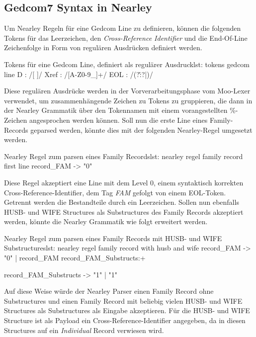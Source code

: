 \subsection{Gedcom7 Syntax in Nearley}
\label{subsec: Implementierung - Gedcom Grammatik - Gedcom7 Syntax in Nearley}
Um Nearley Regeln für eine Gedcom Line zu definieren, können die folgenden Tokens für das Leerzeichen, den \textit{Cross-Reference Identifier} und die End-Of-Line Zeichenfolge in Form von regulären Ausdrücken definiert werden.
\vspace{1em}
\begin{javascript}{Tokens für eine Gedcom Line, definiert als regulärer Ausdruck}{lst: tokens gedcom line}
	D    : /[ ]/
	Xref : /\@[A-Z0-9\_]+\@/	
	EOL  : /(?:\r\n?|\n)/
\end{javascript}
\newpage
{
\noindent
Diese regulären Ausdrücke werden in der Vorverarbeitungsphase vom Moo-Lexer verwendet, um zusammenhängende Zeichen zu Tokens zu gruppieren, die dann in der Nearley Grammatik über den Tokennamen mit einem vorangestellten \%-Zeichen angesprochen werden können. Soll nun die erste Line eines Family-Records geparsed werden, könnte dies mit der folgenden Nearley-Regel umgesetzt werden.
}
\vspace{0em}
\begin{javascript}{Nearley Regel zum parsen eines Family Records}{lst: nearley regel family record first line}
	record_FAM -> "0"  %
\end{javascript}
\vspace{1em}
Diese Regel akzeptiert eine Line mit dem Level 0, einem syntaktisch korrekten Cross-Reference-Identifier, dem Tag \textit{FAM} gefolgt von einem EOL-Token. Getrennt werden die Bestandteile durch ein Leerzeichen. Sollen nun ebenfalls HUSB- und WIFE Structures als Substructures des Family Records akzeptiert werden, könnte die Nearley Grammatik wie folgt erweitert werden.
\vspace{1em}
\begin{javascript}{Nearley Regel zum parsen eines Family Records mit HUSB- und WIFE Substructures}{lst: nearley regel family record with husb and wife}
	record_FAM
		-> "0"  %
		|  record_FAM  record_FAM_Substructs:+
	
	record_FAM_Substructs 
		-> "1"  %
		|  "1"  %
\end{javascript}
\vspace{1em}
Auf diese Weise würde der Nearley Parser einen Family Record ohne Substructures und einen Family Record mit beliebig vielen HUSB- und WIFE Structures als Substructures als Eingabe akzeptieren. Für die HUSB- und WIFE Structure ist als Payload ein Cross-Reference-Identifier angegeben, da in diesen Structures auf ein \textit{Individual} Record verwiesen wird.

